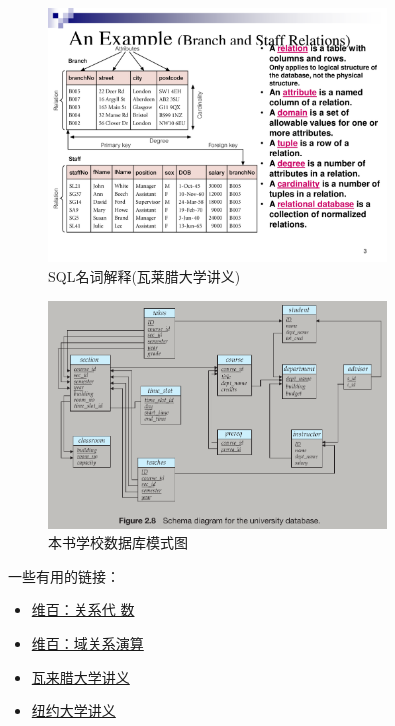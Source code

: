 \documentclass{dingjia}
\begin{document}
\begin{figure}[ht]
  \centering
  \includegraphics[width=0.8\textwidth]{img/sqlNorn.png}
  \caption{\label{fig:sqlnorn}SQL名词解释(瓦莱腊大学讲义) }
\end{figure}

\begin{figure}[ht]
  \centering
  \includegraphics[width=0.8\textwidth]{img/schoolmodel.png}
  \caption{\label{fig:school}本书学校数据库模式图 }
\end{figure}

一些有用的链接：
\begin{itemize}
\item \href{https://en.wikipedia.org/wiki/Relational\_algebra}{维百：关系代
    数}
\item \href{https://en.wikipedia.org/wiki/Domain\_relational\_calculus}{维百：域关系演算}
\item \href{http://mit.wu.ac.th/mit/images/editor/files/db-lecture03-2013.pdf}{瓦来腊大学讲义}
\item \href{https://cs.nyu.edu/~jcf/classes/CSCI-GA.2433-001_sp15/slides/session5/RelationalAlgebra-RelationalCalculus-SQL.pdf}{纽约大学讲义}
\end{itemize}
\end{document}
